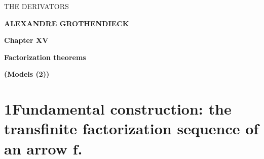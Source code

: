 \printedpage{---}

\begin{center}
{\Large\textsf{THE DERIVATORS}}

\bigskip

\textbf{ALEXANDRE GROTHENDIECK}

\vspace{2cm}

\textbf{Chapter XV}

\medskip

\textbf{Factorization theorems}

\textbf{(Models (2))}
\end{center}

\clearpage

\printedpage{---}


\clearpage



\section*{1\quad Fundamental construction: the transfinite factorization sequence of an arrow $\boldsymbol{f}$.}

